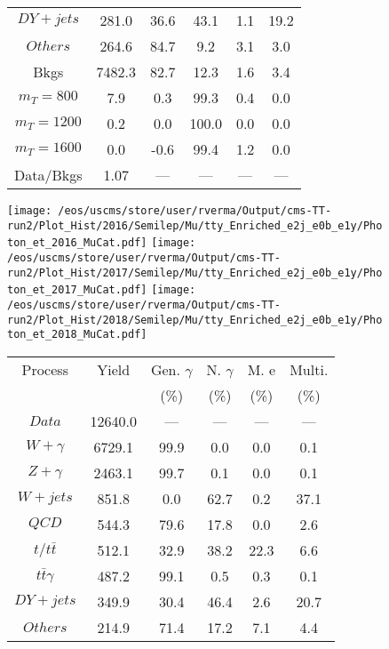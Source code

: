 \begin{figure}
\begin{minipage}[c]{0.32\textwidth}
{\begin{tabular}{cccccc}
$ DY+jets $ &  281.0 &  36.6 &  43.1 &  1.1 &  19.2\\
$ Others $ &  264.6 &  84.7 &  9.2 &  3.1 &  3.0\\
Bkgs &  7482.3 &  82.7 &  12.3 &  1.6 &  3.4\\
$ m_{T} = 800 $ &  7.9 &  0.3 &  99.3 &  0.4 &  0.0\\
$ m_{T} = 1200 $ &  0.2 &  0.0 &  100.0 &  0.0 &  0.0\\
$ m_{T} = 1600 $ &  0.0 &  -0.6 &  99.4 &  1.2 &  0.0\\
Data/Bkgs &  1.07 &  --- &  --- &  --- &  ---\\
\hline
\end{tabular}
}
\end{minipage}
\end{figure}

\begin{figure}
\centering
\texttt{[image: /eos/uscms/store/user/rverma/Output/cms-TT-run2/Plot\_Hist/2016/Semilep/Mu/tty\_Enriched\_e2j\_e0b\_e1y/Photon\_et\_2016\_MuCat.pdf]}
\texttt{[image: /eos/uscms/store/user/rverma/Output/cms-TT-run2/Plot\_Hist/2017/Semilep/Mu/tty\_Enriched\_e2j\_e0b\_e1y/Photon\_et\_2017\_MuCat.pdf]}
\texttt{[image: /eos/uscms/store/user/rverma/Output/cms-TT-run2/Plot\_Hist/2018/Semilep/Mu/tty\_Enriched\_e2j\_e0b\_e1y/Photon\_et\_2018\_MuCat.pdf]}
\begin{minipage}[c]{0.32\textwidth}
\centering
\tiny{
\begin{tabular}{cccccc}
\hline
Process & Yield & Gen. $\gamma$ & N. $\gamma$ & M. e & Multi. \\
 &  & (\%) & (\%) & (\%) & (\%)  \\
\hline
                                                                      $ Data $ &  12640.0 &  --- &  --- &  --- &  ---\\
$ W+\gamma $ &  6729.1 &  99.9 &  0.0 &  0.0 &  0.1\\
$ Z+\gamma $ &  2463.1 &  99.7 &  0.1 &  0.0 &  0.1\\
$ W+jets $ &  851.8 &  0.0 &  62.7 &  0.2 &  37.1\\
$ QCD $ &  544.3 &  79.6 &  17.8 &  0.0 &  2.6\\
$ t/t\bar{t} $ &  512.1 &  32.9 &  38.2 &  22.3 &  6.6\\
$ t\bar{t}\gamma $ &  487.2 &  99.1 &  0.5 &  0.3 &  0.1\\
$ DY+jets $ &  349.9 &  30.4 &  46.4 &  2.6 &  20.7\\
$ Others $ &  214.9 &  71.4 &  17.2 &  7.1 &  4.4\\

\end{tabular}}
\end{minipage}
\end{figure}
